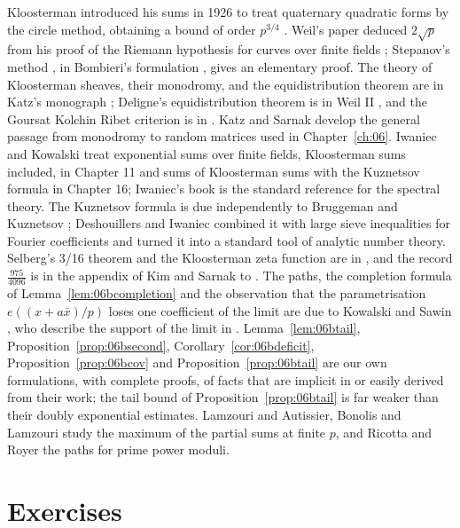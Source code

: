 Kloosterman introduced his sums in 1926 to treat quaternary quadratic forms by the circle method, obtaining a bound of order $p^{3/4}$ \cite{kloosterman1926}. Weil's paper \cite{weil1948b} deduced $2\sqrt p$ from his proof of the Riemann hypothesis for curves over finite fields \cite{weil1948}; Stepanov's method \cite{stepanov1969}, in Bombieri's formulation \cite{bombieri1974}, gives an elementary proof. The theory of Kloosterman sheaves, their monodromy, and the equidistribution theorem are in Katz's monograph \cite{katz1988}; Deligne's equidistribution theorem is in Weil II \cite{deligne1980}, and the Goursat Kolchin Ribet criterion is in \cite{katz1990}. Katz and Sarnak \cite{katzsarnak1999} develop the general passage from monodromy to random matrices used in Chapter~\ref{ch:06}. Iwaniec and Kowalski \cite{iwanieckowalski2004} treat exponential sums over finite fields, Kloosterman sums included, in Chapter 11 and sums of Kloosterman sums with the Kuznetsov formula in Chapter 16; Iwaniec's book \cite{iwaniec2002} is the standard reference for the spectral theory. The Kuznetsov formula is due independently to Bruggeman \cite{bruggeman1978} and Kuznetsov \cite{kuznetsov1980}; Deshouillers and Iwaniec \cite{deshouillersiwaniec1982} combined it with large sieve inequalities for Fourier coefficients and turned it into a standard tool of analytic number theory. Selberg's 3/16 theorem and the Kloosterman zeta function are in \cite{selberg1965}, and the record $\frac{975}{4096}$ is in the appendix of Kim and Sarnak to \cite{kimsarnak2003}. The paths, the completion formula of Lemma~\ref{lem:06bcompletion} and the observation that the parametrisation $e((x+a\bar x)/p)$ loses one coefficient of the limit are due to Kowalski and Sawin \cite{kowalskisawin2016}, who describe the support of the limit in \cite{kowalskisawin2017}. Lemma~\ref{lem:06btail}, Proposition~\ref{prop:06bsecond}, Corollary~\ref{cor:06bdeficit}, Proposition~\ref{prop:06bcov} and Proposition~\ref{prop:06btail} are our own formulations, with complete proofs, of facts that are implicit in or easily derived from their work; the tail bound of Proposition~\ref{prop:06btail} is far weaker than their doubly exponential estimates. Lamzouri \cite{lamzouri2020} and Autissier, Bonolis and Lamzouri \cite{abl2021} study the maximum of the partial sums at finite $p$, and Ricotta and Royer \cite{ricottaroyer2018} the paths for prime power moduli.

\section{Exercises}

